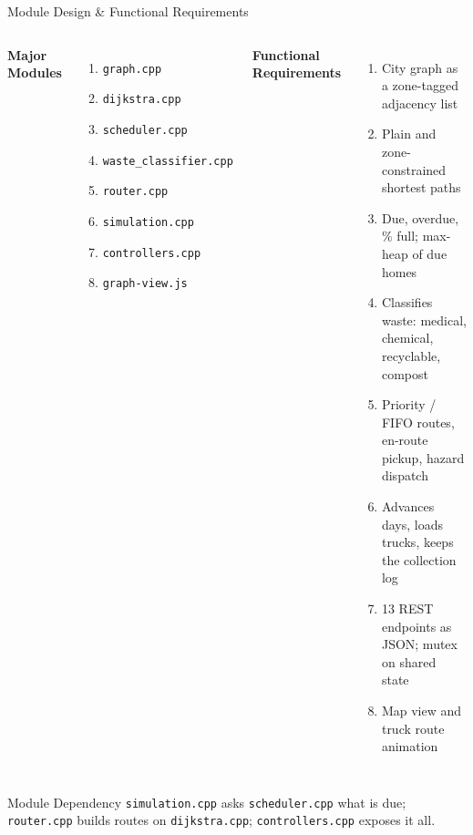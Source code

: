 \documentclass[aspectratio=169,11pt]{beamer}
\begin{document}
\begin{frame}{Module Design \& Functional Requirements}
\scriptsize

\begin{columns}[T,totalwidth=\textwidth]


\textbf{\color{GEUBlue}Major Modules}

\begin{enumerate}\itemsep2pt
\item \texttt{graph.cpp}
\item \texttt{dijkstra.cpp}
\item \texttt{scheduler.cpp}
\item \texttt{waste\_classifier.cpp}
\item \texttt{router.cpp}
\item \texttt{simulation.cpp}
\item \texttt{controllers.cpp}
\item \texttt{graph-view.js}
\end{enumerate}


\textbf{\color{GEUBlue}Functional Requirements}

\begin{enumerate}\itemsep2pt
\item City graph as a zone-tagged adjacency list
\item Plain and zone-constrained shortest paths
\item Due, overdue, \% full; max-heap of due homes
\item Classifies waste: medical, chemical, recyclable, compost
\item Priority / FIFO routes, en-route pickup, hazard dispatch
\item Advances days, loads trucks, keeps the collection log
\item 13 REST endpoints as JSON; mutex on shared state
\item Map view and truck route animation
\end{enumerate}

\end{columns}

\vfill

\begin{block}{Module Dependency}
\texttt{simulation.cpp} asks \texttt{scheduler.cpp} what is due; \texttt{router.cpp} builds routes on \texttt{dijkstra.cpp}; \texttt{controllers.cpp} exposes it all.
\end{block}

\end{frame}
\end{document}
